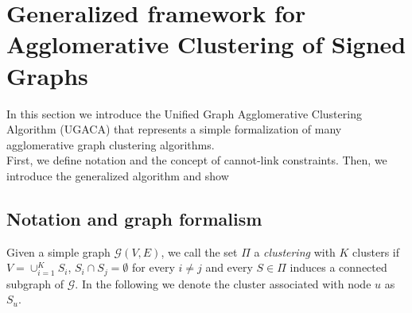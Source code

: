 \section{Generalized framework for Agglomerative Clustering of Signed Graphs}
In this section we introduce the Unified Graph Agglomerative Clustering Algorithm (UGACA) that represents a simple  formalization of many agglomerative graph clustering algorithms. \\
First, we define notation and the concept of cannot-link constraints. Then, we introduce the generalized algorithm and show 

\subsection{Notation and graph formalism} \label{sec:notation}

Given a simple graph $\mathcal{G}(V,E)$, we call the set $\Pi$ a \emph{clustering} with $K$ clusters if $V = \cup_{i=1}^K S_i $, $S_i \cap S_j = \emptyset$ for every $i\neq j$ and every $S \in \Pi$ induces a connected subgraph of $\mathcal{G}$. In the following we denote the cluster associated with node $u$ as $S_u$.

